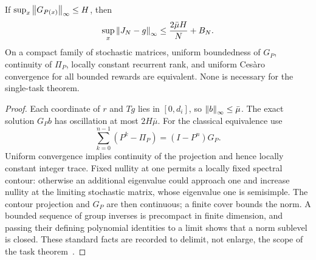 \begin{corollary}\label{cor:group}
If $\sup_x\left\lVert G_{P(x)}\right\rVert_\infty\le H$, then
\[
 \sup_x\left\lVert J_N-g\right\rVert_\infty\le\frac{2\bar\mu H}{N}+B_N.
\]
On a compact family of stochastic matrices, uniform boundedness of $G_P$, continuity of $\Pi_P$, locally constant recurrent rank, and uniform Ces\`aro convergence for all bounded rewards are equivalent. None is necessary for the single-task theorem.
\end{corollary}
\begin{proof}
Each coordinate of $r$ and $Tg$ lies in $[0,d_i]$, so $\left\lVert b\right\rVert_\infty\le\bar\mu$. The exact solution $G_Pb$ has oscillation at most $2H\bar\mu$. For the classical equivalence use
\[
 \sum_{k=0}^{n-1}(P^k-\Pi_P)=(I-P^n)G_P.
\]
Uniform convergence implies continuity of the projection and hence locally constant integer trace. Fixed nullity at one permits a locally fixed spectral contour: otherwise an additional eigenvalue could approach one and increase nullity at the limiting stochastic matrix, whose eigenvalue one is semisimple. The contour projection and $G_P$ are then continuous; a finite cover bounds the norm. A bounded sequence of group inverses is precompact in finite dimension, and passing their defining polynomial identities to a limit shows that a norm sublevel is closed. These standard facts are recorded to delimit, not enlarge, the scope of the task theorem~\cite{Meyer,LamondPuterman}.
\end{proof}

